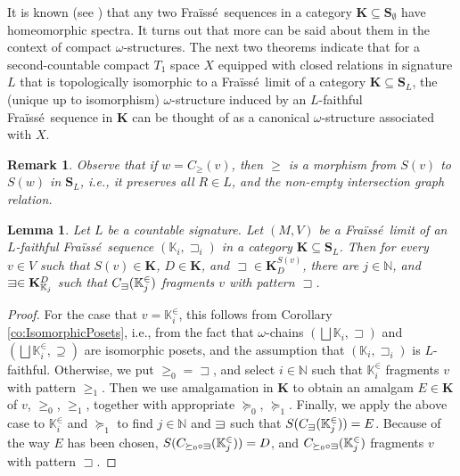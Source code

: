 \documentclass[12pt]{amsart}
\theoremstyle{plain}
\newtheorem{lemma}[theorem]{Lemma}
\newtheorem{remark}[theorem]{\bf Remark}
\newcommand \sqsp{\sqsupset}
\newcommand{\sqni}{\mathrel{\vphantom{\sqsupset}\text{\mathsurround=0pt\ooalign{$\sqsupset$\cr$-$\cr}}}}
\newcommand \fra{Fra\"{i}ss\'{e}}
\newcommand \KKf{\mathbf{K}}
\newcommand \SSf{\mathbf{S}}
\newcommand \KKb{\mathbb{K}}
\newcommand \NN{\mathbb{N}}
\begin{document}
It is known (see \cite[Proposition 4.32]{BaBiVi2}) that any two \fra \ sequences in a category $\KKf \subseteq \SSf_\emptyset$ have homeomorphic spectra. It turns out that more can be said about them in the context of compact $\omega$-structures. The next two theorems indicate that for a second-countable compact $T_1$ space $X$ equipped with closed relations in signature $L$ that is topologically isomorphic to a \fra \ limit of a category $\KKf \subseteq \SSf_L$,  the (unique up to isomorphism) $\omega$-structure induced by an $L$-faithful  \fra \ sequence in $\KKf$ can be thought of as a canonical $\omega$-structure associated with $X$. 

\begin{remark}
Observe that if $w=C_\geq(v)$, then $\geq$ is a morphism from $S(v)$ to $S(w)$ in $\SSf_L$, i.e., it preserves all $R \in L$, and the non-empty intersection graph relation. 
\end{remark}

\begin{lemma}
	\label{le:TypesIso}
Let $L$ be a countable signature. Let $(M,V)$ be a \fra \ limit of an $L$-faithful \fra \  sequence $(\KKb_i, \sqsp_i)$ in a category $\KKf \subseteq \SSf_L$. Then for every $v \in V$ such that $S(v) \in \KKf$, $D \in \KKf$,  and $\sqsp \in \KKf^{S(v)}_{D}$, there are $j \in \NN$, and $\sqni \in \KKf^{D}_{\KKb_j}$ such that $C_{\sqni} (\KKb^\in_j)$ fragments $v$ with pattern $\sqsp$.
\end{lemma}

\begin{proof}
	For the case that $v=\KKb_i^\in$, this follows from Corollary \ref{co:IsomorphicPosets}, i.e., from the fact that $\omega$-chains $(\bigsqcup \KKb_i, \sqsp)$ and $(\bigsqcup \KKb^\in_i, \supseteq)$  are isomorphic posets, and the assumption that $(\KKb_i, \sqsp_i)$ is $L$-faithful. Otherwise, we put $\geq_0=\sqsp$, and select $i \in \NN$ such that $\KKb^\in_i$ fragments $v$ with pattern $\geq_1$. Then we use amalgamation in $\KKf$ to obtain an amalgam $E \in \KKf$ of $v$, $\geq_0$, $\geq_1$, together with appropriate $\succeq_0$, $\succeq_1$. Finally, we apply the above case to $\KKb^\in_i$ and $\succeq_1$ to find $j \in \NN$ and $\sqni$ such that $S(C_{\sqni}(\KKb^\in_j))=E$. Because of the way $E$ has been chosen,  $S(C_{\succeq_0 \circ \sqni}(\KKb^\in_j))=D$, and $C_{\succeq_0 \circ \sqni}(\KKb^\in_j)$ fragments $v$ with pattern $\sqsp$. %
	
\end{proof}
\end{document}
